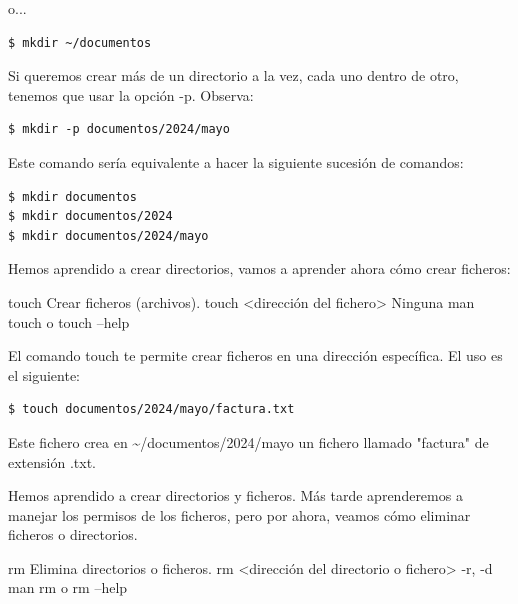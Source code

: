 o...

\begin{tcolorbox-code}
\begin{lstlisting}
$ mkdir ~/documentos
\end{lstlisting}
\end{tcolorbox-code}

Si queremos crear más de un directorio a la vez, cada uno dentro de otro, tenemos que usar la opción -p. Observa:

\begin{tcolorbox-code}
\begin{lstlisting}
$ mkdir -p documentos/2024/mayo
\end{lstlisting}
\end{tcolorbox-code}

Este comando sería equivalente a hacer la siguiente sucesión de comandos:

\begin{tcolorbox-code}
\begin{lstlisting}
$ mkdir documentos
$ mkdir documentos/2024
$ mkdir documentos/2024/mayo
\end{lstlisting}
\end{tcolorbox-code}

Hemos aprendido a crear directorios, vamos a aprender ahora cómo crear ficheros:

\begin{command-info}
{touch}
{Crear ficheros (archivos).}
{touch <dirección del fichero>}
{Ninguna}
{man touch o touch --help}
\end{command-info}

El comando touch te permite crear ficheros en una dirección específica. El uso es el siguiente:

\begin{tcolorbox-code}
\begin{lstlisting}
$ touch documentos/2024/mayo/factura.txt
\end{lstlisting}
\end{tcolorbox-code}

Este fichero crea en \textasciitilde/documentos/2024/mayo un fichero llamado "factura" de extensión .txt.

Hemos aprendido a crear directorios y ficheros. Más tarde aprenderemos a manejar los permisos de los ficheros, pero por ahora, veamos cómo eliminar ficheros o directorios.

\begin{command-info}
{rm}
{Elimina directorios o ficheros.}
{rm <dirección del directorio o fichero>}
{-r, -d}
{man rm o rm --help}
\end{command-info}

